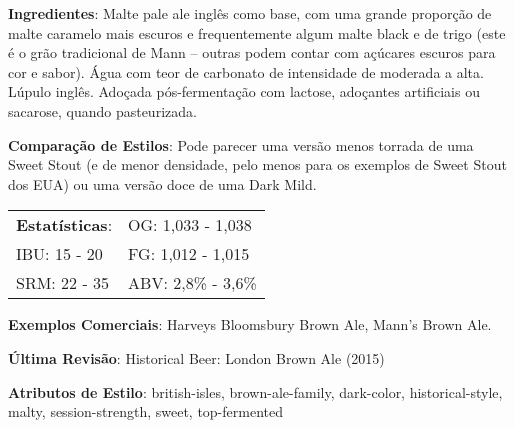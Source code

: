 \textbf{Ingredientes}: Malte pale ale inglês como base, com uma grande proporção de malte caramelo mais escuros e frequentemente algum malte black e de trigo (este é o grão tradicional de Mann – outras podem contar com açúcares escuros para cor e sabor). Água com teor de carbonato de intensidade de moderada a alta. Lúpulo inglês. Adoçada pós-fermentação com lactose, adoçantes artificiais ou sacarose, quando pasteurizada.

\textbf{Comparação de Estilos}: Pode parecer uma versão menos torrada de uma Sweet Stout (e de menor densidade, pelo menos para os exemplos de Sweet Stout dos EUA) ou uma versão doce de uma Dark Mild.

\begin{tabular}{@{}p{35mm}p{35mm}@{}}
  \textbf{Estatísticas}: & OG: 1,033 - 1,038  \\
  IBU: 15 - 20  & FG: 1,012 - 1,015  \\
  SRM: 22 - 35 & ABV: 2,8\% - 3,6\%
\end{tabular}

\textbf{Exemplos Comerciais}: Harveys Bloomsbury Brown Ale, Mann's Brown Ale.

\textbf{Última Revisão}: Historical Beer: London Brown Ale (2015)

\textbf{Atributos de Estilo}: british-isles, brown-ale-family, dark-color, historical-style, malty, session-strength, sweet, top-fermented

